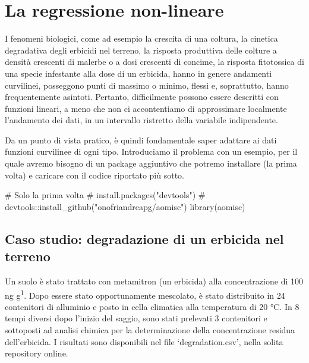 \documentclass[a4paper,12pt,oneside]{book}
\newenvironment{Shaded}{\begin{snugshade}}{\end{snugshade}}
\newcommand{\CommentTok}[1]{#1}
\newcommand{\FunctionTok}[1]{#1}
\newcommand{\NormalTok}[1]{#1}
\begin{document}
\hypertarget{la-regressione-non-lineare}{%
\chapter{La regressione non-lineare}\label{la-regressione-non-lineare}}

I fenomeni biologici, come ad esempio la crescita di una coltura, la cinetica degradativa degli erbicidi nel terreno, la risposta produttiva delle colture a densità crescenti di malerbe o a dosi crescenti di concime, la risposta fitotossica di una specie infestante alla dose di un erbicida, hanno in genere andamenti curvilinei, posseggono punti di massimo o minimo, flessi e, soprattutto, hanno frequentemente asintoti. Pertanto, difficilmente possono essere descritti con funzioni lineari, a meno che non ci accontentiamo di approssimare localmente l'andamento dei dati, in un intervallo ristretto della variabile indipendente.

Da un punto di vista pratico, è quindi fondamentale saper adattare ai dati funzioni curvilinee di ogni tipo. Introduciamo il problema con un esempio, per il quale avremo bisogno di un package aggiuntivo che potremo installare (la prima volta) e caricare con il codice riportato più sotto.

\begin{Shaded}
\begin{Highlighting}[]
\CommentTok{\# Solo la prima volta}
\CommentTok{\# install.packages("devtools")}
\CommentTok{\# devtools::install\_github("onofriandreapg/aomisc")}
\FunctionTok{library}\NormalTok{(aomisc)}
\end{Highlighting}
\end{Shaded}

\hypertarget{caso-studio-degradazione-di-un-erbicida-nel-terreno}{%
\section{Caso studio: degradazione di un erbicida nel terreno}\label{caso-studio-degradazione-di-un-erbicida-nel-terreno}}

Un suolo è stato trattato con metamitron (un erbicida) alla concentrazione di 100 ng g\textsuperscript{1}. Dopo essere stato opportunamente mescolato, è stato distribuito in 24 contenitori di alluminio e posto in cella climatica alla temperatura di 20 °C. In 8 tempi diversi dopo l'inizio del saggio, sono stati prelevati 3 contenitori e sottoposti ad analisi chimica per la determinazione della concentrazione residua dell'erbicida. I risultati sono disponibili nel file `degradation.csv', nella solita repository online.
\end{document}
